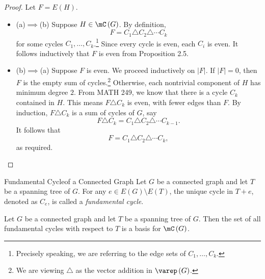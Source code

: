 \documentclass[co342]{subfiles}
\begin{document}
    \begin{proof}
        Let $F=E\left( H \right)$.
        \begin{itemize}
            \item (a)$\implies$(b) Suppose $H\in\mC\left( G \right)$. By definition,
                \begin{equation*}
                    F = C_1\triangle C_2\triangle\cdots C_k
                \end{equation*}
                for some cycles $C_1,\ldots,C_k$.\footnote{Precisely speaking, we are referring to the edge sets of $C_1,\ldots,C_k$.} Since every cycle is even, each $C_i$ is even. It follows inductively that $F$ is even from Proposition 2.5.
            \item (b)$\implies$(a) Suppose $F$ is even. We proceed inductively on $\left| F \right|$. If $\left| F \right|=0$, then $F$ is the empty sum of cycles.\footnote{We are viewing $\triangle$ as the vector addition in $\varep\left( G \right)$.} Otherwise, each nontrivial component of $H$ has minimum degree $2$. From MATH 249, we know that there is a cycle $C_k$ contained in $H$. This means $F\triangle C_k$ is even, with fewer edges than $F$. By induction, $F\triangle C_k$ is a sum of cycles of $G$, say
                \begin{equation*}
                    F\triangle C_k = C_1\triangle C_2\triangle\cdots C_{k-1}.
                \end{equation*}
                It follows that
                \begin{equation*}
                    F = C_1\triangle C_2\triangle\cdots C_k,
                \end{equation*}
                as required. \qqedsym
        \end{itemize} 
    \end{proof}

    \begin{definition}{Fundamental Cycle}{of a Connected Graph}
        Let $G$ be a connected graph and let $T$ be a spanning tree of $G$. For any $e\in E\left( G \right)\setminus E\left( T \right)$, the unique cycle in $T+e$, denoted as $C_e$, is called a \emph{fundamental cycle}.
    \end{definition}

    \begin{prop}{}
        Let $G$ be a connected graph and let $T$ be a spanning tree of $G$. Then the set of all fundamental cycles with respect to $T$ is a basis for $\mC\left( G \right)$.
    \end{prop}
    
\end{document}
